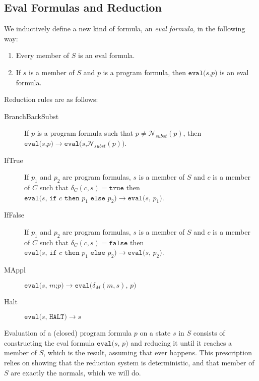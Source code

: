 \documentclass[11pt]{article}
\begin{document}
\subsection{Eval Formulas and Reduction}

We inductively define a new kind of formula, an \emph{eval formula}, in the following way:

\begin{enumerate}
\item Every member of $S$ is an eval formula.
\item If $s$ is a member of $S$ and $p$ is a program formula, then $\texttt{eval(}s\texttt{,} p\texttt{)}$ is an eval formula.
\end{enumerate}

Reduction rules are as follows:

\begin{description}
\item[BranchBackSubst] If $p$ is a program formula such that $p \neq \mathcal{N}_{subst}(p)$, then $\texttt{eval(}s\texttt{,} p\texttt{)} \longrightarrow \texttt{eval(}s\texttt{,} \mathcal{N}_{subst}(p)\texttt{)}$.
\item[IfTrue] If $p_{1}$ and $p_{2}$ are program formulas, $s$ is a member of $S$ and $c$ is a member of $C$ such that $\delta_{C}(c, s) = \texttt{true}$ then \\ $\texttt{eval(} s \texttt{, } \texttt{if } c \texttt{ then } p_{1} \texttt{ else } p_{2} \texttt{)} \longrightarrow \texttt{eval(} s \texttt{, } p_{1} \texttt{)}$.
\item[IfFalse] If $p_{1}$ and $p_{2}$ are program formulas, $s$ is a member of $S$ and $c$ is a member of $C$ such that $\delta_{C}(c, s) = \texttt{false}$ then \\ $\texttt{eval(} s \texttt{, } \texttt{if } c \texttt{ then } p_{1} \texttt{ else } p_{2} \texttt{)} \longrightarrow \texttt{eval(} s \texttt{, } p_{2} \texttt{)}$.
\item[MAppl] $\texttt{eval(}s\texttt{, } m\texttt{;}p \texttt{)} \longrightarrow \texttt{eval(} \delta_{M}(m, s)\texttt{, } p \texttt{)}$
\item[Halt] $\texttt{eval(}s\texttt{, } \texttt{HALT)} \longrightarrow s$
\end{description}

Evaluation of a (closed) program formula $p$ on a state $s$ in $S$ consists of constructing the eval formula $\texttt{eval(}s\texttt{, } p \texttt{)}$ and reducing it until it reaches a member of $S$, which is the result, assuming that ever happens.  This prescription relies on showing that the reduction system is deterministic, and that member of $S$ are exactly the normals, which we will do.
\end{document}
